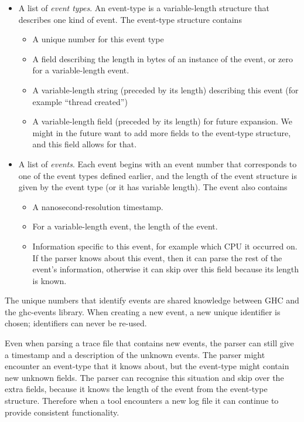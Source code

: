 \documentclass[twocolumn,9pt]{sigplanconf}
\newcommand{\codef}[1]{{\fontfamily{cmss}\small#1}}
\begin{document}
\begin{itemize}
\item A list of \emph{event types}.  An event-type is a
  variable-length structure that describes one kind of event.  The
  event-type structure contains
  \begin{itemize}
    \item A unique number for this event type
    \item A field describing the length in bytes of an instance of the
      event, or zero for a variable-length event.
    \item A variable-length string (preceded by its length) describing
      this event (for example ``thread created'')
    \item A variable-length field (preceded by its length) for future
      expansion.  We might in the future want to add more fields to
      the event-type structure, and this field allows for that.
  \end{itemize}
\item A list of \emph{events}.  Each event begins with an event number
  that corresponds to one of the event types defined earlier, and the
  length of the event structure is given by the event type (or it has
  variable length).  The event also contains
  \begin{itemize}
  \item A nanosecond-resolution timestamp.
  \item For a variable-length event, the length of the event.
  \item Information specific to this event, for example which CPU it
    occurred on.  If the parser knows about this event, then it can
    parse the rest of the event's information, otherwise it can skip
    over this field because its length is known.
  \end{itemize}
\end{itemize}

The unique numbers that identify events are shared knowledge between
GHC and the \codef{ghc-events} library.  When creating a new event, a new
unique identifier is chosen; identifiers can never be re-used.

Even when parsing a trace file that contains new events, the parser
can still give a timestamp and a description of the unknown events.
The parser might encounter an event-type that it knows about, but the
event-type might contain new unknown fields.  The parser can recognise
this situation and skip over the extra fields, because it knows the
length of the event from the event-type structure.  Therefore when a
tool encounters a new log file it can continue to provide consistent
functionality.
\end{document}
